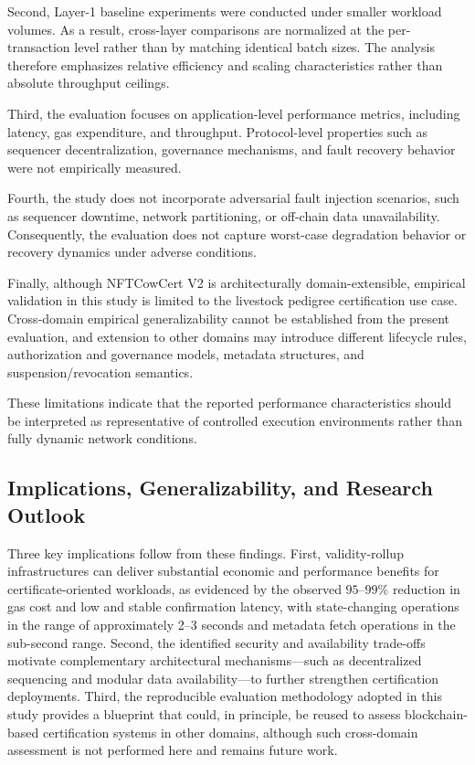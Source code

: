 \documentclass[pdflatex,sn-mathphys-num]{sn-jnl}
\begin{document}
Second, Layer-1 baseline experiments were conducted under smaller workload volumes. As a result, cross-layer comparisons are normalized at the per-transaction level rather than by matching identical batch sizes. The analysis therefore emphasizes relative efficiency and scaling characteristics rather than absolute throughput ceilings.

Third, the evaluation focuses on application-level performance metrics, including latency, gas expenditure, and throughput. Protocol-level properties such as sequencer decentralization, governance mechanisms, and fault recovery behavior were not empirically measured.

Fourth, the study does not incorporate adversarial fault injection scenarios, such as sequencer downtime, network partitioning, or off-chain data unavailability. Consequently, the evaluation does not capture worst-case degradation behavior or recovery dynamics under adverse conditions.

Finally, although NFTCowCert V2 is architecturally domain-extensible, empirical validation in this study is limited to the livestock pedigree certification use case. Cross-domain empirical generalizability cannot be established from the present evaluation, and extension to other domains may introduce different lifecycle rules, authorization and governance models, metadata structures, and suspension/revocation semantics.

These limitations indicate that the reported performance characteristics should be interpreted as representative of controlled execution environments rather than fully dynamic network conditions.


\subsection{Implications, Generalizability, and Research Outlook}

Three key implications follow from these findings. First, validity-rollup infrastructures can deliver substantial economic and performance benefits for certificate-oriented workloads, as evidenced by the observed $95$--$99\%$ reduction in gas cost and low and stable confirmation latency, with state-changing operations in the range of approximately 2--3 seconds and metadata fetch operations in the sub-second range. Second, the identified security and availability trade-offs motivate complementary architectural mechanisms—such as decentralized sequencing and modular data availability—to further strengthen certification deployments. Third, the reproducible evaluation methodology adopted in this study provides a blueprint that could, in principle, be reused to assess blockchain-based certification systems in other domains, although such cross-domain assessment is not performed here and remains future work.
\end{document}
